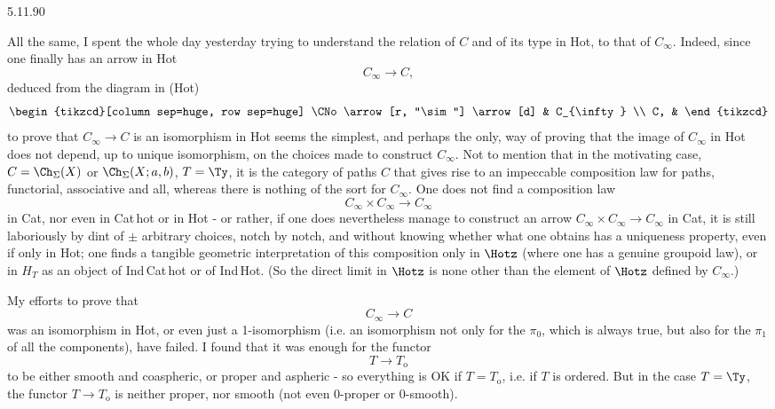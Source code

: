 \begin{flushright}
{\footnotesize 5.11.90}
\end{flushright}

All the same, I spent the whole day yesterday trying to understand the relation of $C$ and of its type in Hot, to that of $C_{\infty}$. Indeed, since one finally has an arrow in Hot
\[
C_{\infty} \longrightarrow C,
\]
deduced from the diagram in (Hot)
\[
\begin{tikzcd}[column sep=huge, row sep=huge]
\CNo \arrow[r, "\sim"] \arrow[d] & C_{\infty} \\
C, &
\end{tikzcd}
\]
to prove that $C_{\infty} \longrightarrow C$ is an isomorphism in Hot
seems the simplest, and perhaps the only, way of proving that the image of $C_{\infty}$ in Hot does not depend, up to unique isomorphism, on the choices made to construct $C_{\infty}$. Not to mention that in the motivating case, $C = \Ch_{\Sigma}(X)$ or $\Ch_{\Sigma}(X;a,b)$, $T = \Ty$, it is the category of paths $C$ that gives rise to an impeccable composition law for paths, functorial, associative and all, whereas there is nothing of the sort for $C_{\infty}$. One does not find a composition law
\[
C_{\infty} \times C_{\infty} \longrightarrow C_{\infty}
\]
in Cat, nor even in Cat\,hot or in Hot - or rather, if one does nevertheless manage to construct an arrow $C_{\infty} \times C_{\infty} \longrightarrow C_{\infty}$ in Cat, it is still laboriously by dint of $\pm$ arbitrary choices, notch by notch, and without knowing whether what one obtains has a uniqueness property, even if only in Hot; one finds a tangible geometric interpretation of this composition only in $\Hotz$ (where one has a genuine groupoid law), or in $H_{T}$ as an object of Ind\,Cat\,hot
or of Ind\,Hot. (So the direct limit in $\Hotz$ is none other than the element of $\Hotz$ defined by $C_{\infty}$.)

My efforts to prove that
\[
C_{\infty} \longrightarrow C
\]
was an isomorphism in Hot, or even just a 1-isomorphism (i.e. an isomorphism not only for the $\pi_{0}$, which is always true, but also for the $\pi_{1}$ of all the components), have failed. I found that it was enough for the functor %
\[
T \longrightarrow T_{\mathrm{o}}
\]
to be either smooth and coaspheric, or proper and aspheric - so everything is OK if $T = T_{\mathrm{o}}$, i.e. if $T$ is ordered. But in the case $T = \Ty$, the functor $T \longrightarrow T_{\mathrm{o}}$ is neither proper, nor smooth (not even 0-proper or 0-smooth).

